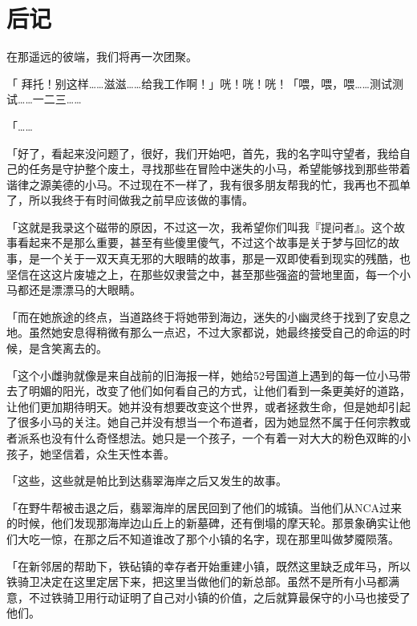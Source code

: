\chapter{后记}

\pagestyle{chinese} %


\begin{intro}
    在那遥远的彼端，我们将再一次团聚。
\end{intro}

{\rt

「 拜托！别这样……滋滋……给我工作啊！」咣！咣！咣！「喂，喂，喂……测试测试……一二三……

「……

「好了，看起来没问题了，很好，我们开始吧，首先，我的名字叫守望者，我给自己的任务是守护整个废土，寻找那些在冒险中迷失的小马，希望能够找到那些带着谐律之源美德的小马。不过现在不一样了，我有很多朋友帮我的忙，我再也不孤单了，所以我终于有时间做我之前早应该做的事情。

「这就是我录这个磁带的原因，不过这一次，我希望你们叫我『提问者』。这个故事看起来不是那么重要，甚至有些傻里傻气，不过这个故事是关于梦与回忆的故事，是一个关于一双天真无邪的大眼睛的故事，那是一双即使看到现实的残酷，也坚信在这这片废墟之上，在那些奴隶营之中，甚至那些强盗的营地里面，每一个小马都还是漂漂马的大眼睛。

「而在她旅途的终点，当道路终于将她带到海边，迷失的小幽灵终于找到了安息之地。虽然她安息得稍微有那么一点迟，不过大家都说，她最终接受自己的命运的时候，是含笑离去的。

「这个小雌驹就像是来自战前的旧海报一样，她给52号国道上遇到的每一位小马带去了明媚的阳光，改变了他们如何看自己的方式，让他们看到一条更美好的道路，让他们更加期待明天。她并没有想要改变这个世界，或者拯救生命，但是她却引起了很多小马的关注。她自己并没有想当一个布道者，因为她显然不属于任何宗教或者派系也没有什么奇怪想法。她只是一个孩子，一个有着一对大大的粉色双眸的小孩子，她坚信着，众生天性本善。

「这些，这些就是帕比到达翡翠海岸之后又发生的故事。

「在野牛帮被击退之后，翡翠海岸的居民回到了他们的城镇。当他们从NCA过来的时候，他们发现那海岸边山丘上的新墓碑，还有倒塌的摩天轮。那景象确实让他们大吃一惊，在那之后不知道谁改了那个小镇的名字，现在那里叫做梦魇陨落。

「在新邻居的帮助下，铁砧镇的幸存者开始重建小镇，既然这里缺乏成年马，所以铁骑卫决定在这里定居下来，把这里当做他们的新总部。虽然不是所有小马都满意，不过铁骑卫用行动证明了自己对小镇的价值，之后就算最保守的小马也接受了他们。

}
